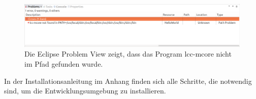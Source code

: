\begin{figure}[H]
	\centering
		\includegraphics[scale=0.25]{compiler/patherror.png}
		\caption{Die Eclipse Problem View zeigt, dass das Program lcc-mcore nicht im Pfad gefunden wurde.}
		\label{fig:patherror}
\end{figure}

In der Installationsanleitung im Anhang finden sich alle Schritte, die notwendig sind, um die Entwicklungsumgebung zu installieren.

